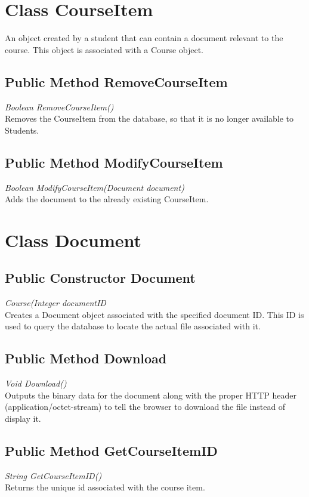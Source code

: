 \documentclass[16pt]{scrreprt}
\begin{document}
\section{Class CourseItem}
An object created by a student that can contain a document relevant to the course. This object is associated with a Course object.

\subsection{Public Method RemoveCourseItem}
\textit{Boolean RemoveCourseItem()} \\
Removes the CourseItem from the database, so that it is no longer available to Students.

\subsection{Public Method ModifyCourseItem}
\textit{Boolean ModifyCourseItem(Document document)} \\
Adds the document to the already existing CourseItem.

\section{Class Document}

\subsection{Public Constructor Document}
\textit{Course(Integer documentID} \\
Creates a Document object associated with the specified document ID. This ID is used to query the database to locate the actual file associated with it.

\subsection{Public Method Download}
\textit{Void Download()} \\
Outputs the binary data for the document along with the proper HTTP header (application/octet-stream) to tell the browser to download the file instead of display it.

\subsection{Public Method GetCourseItemID}
\textit{String GetCourseItemID()} \\
Returns the unique id associated with the course item.
\end{document}
